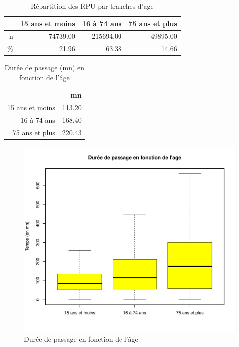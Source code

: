 \documentclass[12pt,english,french,twoside]{book}\usepackage[]{graphicx}\usepackage[]{color}
\makeatletter
\def\maxwidth{ %
  \ifdim\Gin@nat@width>\linewidth
    \linewidth
  \else
    \Gin@nat@width
  \fi
}
\newenvironment{knitrout}{}{} %
\makeatother
\begin{document}
\begin{table}[ht]
\centering
\begin{tabular}{rrrr}
  \hline
 & 15 ans et moins & 16 à 74 ans & 75 ans et plus \\ 
  \hline
n & 74739.00 & 215694.00 & 49895.00 \\ 
  \% & 21.96 & 63.38 & 14.66 \\ 
   \hline
\end{tabular}
\caption[Répartition des RPU par tranches d'age]{Répartition des RPU par tranches d'age } 
\label{tab:tranches_age}
\end{table}




\begin{table}[ht]
\centering
\begin{tabular}{rr}
  \hline
 & mn \\ 
  \hline
15 ans et moins & 113.20 \\ 
  16 à 74 ans & 168.40 \\ 
  75 ans et plus & 220.43 \\ 
   \hline
\end{tabular}
\caption[Durée de passage et age]{Durée de passage (mn) en fonction de l'âge} 
\label{tab:age_dp}
\end{table}



\begin{figure}[ht!]
 \centering
\begin{knitrout}
\color{fgcolor}
\includegraphics[width=\maxwidth]{figure/age_groupe2} 

\end{knitrout}

 \caption{Durée de passage en fonction de l'âge}
 \label{fig:bp_age}
\end{figure}
\end{document}
